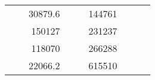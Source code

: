 \begin{table}[]
\begin{tabular}{|ccrccrccc}
\multicolumn{1}{|c|}{\cellcolor[HTML]{FFFFC7}}                                & \multicolumn{1}{c|}{\cellcolor[HTML]{DDFDFF}}                      & \multicolumn{1}{r|}{\cellcolor[HTML]{DAE8FC}30879.6}   & \multicolumn{1}{c|}{\cellcolor[HTML]{FFFFC7}}                                & \multicolumn{1}{c|}{\cellcolor[HTML]{DDFDFF}}                       & \multicolumn{1}{r|}{\cellcolor[HTML]{DDFDFF}144761}    &                                                                              &                                                                    &                                                        \\ \cline{3-3} \cline{6-6}
\multicolumn{1}{|c|}{\cellcolor[HTML]{FFFFC7}}                                & \multicolumn{1}{c|}{\cellcolor[HTML]{DDFDFF}}                      & \multicolumn{1}{r|}{\cellcolor[HTML]{DDFDFF}150127}    & \multicolumn{1}{c|}{\cellcolor[HTML]{FFFFC7}}                                & \multicolumn{1}{c|}{\cellcolor[HTML]{DDFDFF}}                       & \multicolumn{1}{r|}{\cellcolor[HTML]{DAE8FC}231237}    &                                                                              &                                                                    &                                                        \\ \cline{3-3} \cline{6-6}
\multicolumn{1}{|c|}{\cellcolor[HTML]{FFFFC7}}                                & \multicolumn{1}{c|}{\cellcolor[HTML]{DDFDFF}}                      & \multicolumn{1}{r|}{\cellcolor[HTML]{DAE8FC}118070}    & \multicolumn{1}{c|}{\cellcolor[HTML]{FFFFC7}}                                & \multicolumn{1}{c|}{\cellcolor[HTML]{DDFDFF}}                       & \multicolumn{1}{r|}{\cellcolor[HTML]{DDFDFF}266288}    &                                                                              &                                                                    &                                                        \\ \cline{3-3} \cline{6-6}
\multicolumn{1}{|c|}{\cellcolor[HTML]{FFFFC7}}                                & \multicolumn{1}{c|}{\cellcolor[HTML]{DDFDFF}}                      & \multicolumn{1}{r|}{\cellcolor[HTML]{DDFDFF}22066.2}   & \multicolumn{1}{c|}{\cellcolor[HTML]{FFFFC7}}                                & \multicolumn{1}{c|}{\cellcolor[HTML]{DDFDFF}}                       & \multicolumn{1}{r|}{\cellcolor[HTML]{DAE8FC}615510}    &                                                                              &                                                                    &                                                        \\ \cline{3-3} \cline{6-6}

\end{tabular}
\end{table}

